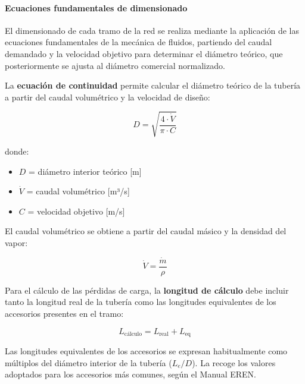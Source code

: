 \documentclass[12pt]{article}
\begin{document}
\paragraph{Ecuaciones fundamentales de dimensionado}

El dimensionado de cada tramo de la red se realiza mediante la aplicación de las ecuaciones fundamentales de la mecánica de fluidos, partiendo del caudal demandado y la velocidad objetivo para determinar el diámetro teórico, que posteriormente se ajusta al diámetro comercial normalizado.

La \textbf{ecuación de continuidad} permite calcular el diámetro teórico de la tubería a partir del caudal volumétrico y la velocidad de diseño:

\begin{equation}
	D = \sqrt{\frac{4 \cdot \dot{V}}{\pi \cdot C}}
	\label{eq:continuidad-diametro}
\end{equation}

\noindent donde:
\begin{itemize}[leftmargin=2em, label={}]
	\item $D$ = diámetro interior teórico [m]
	\item $\dot{V}$ = caudal volumétrico [m³/s]
	\item $C$ = velocidad objetivo [m/s]
\end{itemize}

El caudal volumétrico se obtiene a partir del caudal másico y la densidad del vapor:

\begin{equation}
	\dot{V} = \frac{\dot{m}}{\rho}
	\label{eq:caudal-volumetrico}
\end{equation}

Para el cálculo de las pérdidas de carga, la \textbf{longitud de cálculo} debe incluir tanto la longitud real de la tubería como las longitudes equivalentes de los accesorios presentes en el tramo:

\begin{equation}
	L_{\text{cálculo}} = L_{\text{real}} + L_{\text{eq}}
	\label{eq:longitud-calculo}
\end{equation}

Las longitudes equivalentes de los accesorios se expresan habitualmente como múltiplos del diámetro interior de la tubería ($L_e/D$). La  recoge los valores adoptados para los accesorios más comunes, según el Manual EREN.
\end{document}
